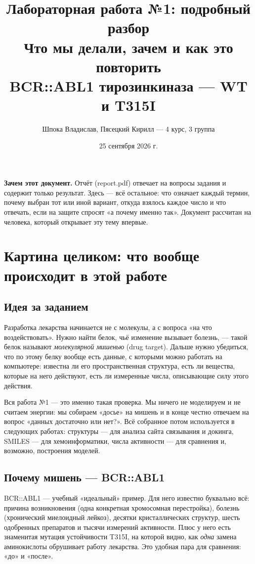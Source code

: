 \documentclass[11pt,a4paper]{article}
\title{\textbf{Лабораторная работа №1: подробный разбор}\\[4pt]
\large Что мы делали, зачем и как это повторить\\[2pt]
\normalsize BCR::ABL1 тирозинкиназа --- WT и T315I}
\author{Шпока Владислав, Пясецкий Кирилл --- 4 курс, 3 группа}
\date{25 сентября 2026 г.}
\newcommand{\code}[1]{{\ttfamily #1}}
\begin{document}
\sloppy
\maketitle

\begin{note}
\textbf{Зачем этот документ.} Отчёт (\code{report.pdf}) отвечает на вопросы задания
и содержит только результат. Здесь --- всё остальное: что означает каждый термин,
почему выбран тот или иной вариант, откуда взялось каждое число и что отвечать,
если на защите спросят «а почему именно так». Документ рассчитан на человека,
который открывает эту тему впервые.
\end{note}

\tableofcontents
\newpage

\section{Картина целиком: что вообще происходит в этой работе}

\subsection{Идея за заданием}

Разработка лекарства начинается не с молекулы, а с вопроса «на что воздействовать».
Нужно найти белок, чьё изменение вызывает болезнь, --- такой белок называют
\emph{молекулярной мишенью} (drug target). Дальше нужно убедиться, что по этому
белку вообще есть данные, с которыми можно работать на компьютере: известна ли
его пространственная структура, есть ли вещества, которые на него действуют, есть
ли измеренные числа, описывающие силу этого действия.

Вся работа №1 --- это именно такая проверка. Мы ничего не моделируем и не считаем
энергии: мы собираем «досье» на мишень и в конце честно отвечаем на вопрос
«данных достаточно или нет?». Всё собранное потом используется в следующих работах:
структуры --- для анализа сайта связывания и докинга, SMILES --- для хемоинформатики,
числа активности --- для сравнения и, возможно, построения моделей.

\subsection{Почему мишень --- BCR::ABL1}

BCR::ABL1 --- учебный «идеальный» пример. Для него известно буквально всё: причина
возникновения (одна конкретная хромосомная перестройка), болезнь (хронический
миелоидный лейкоз), десятки кристаллических структур, шесть одобренных препаратов
и тысячи измерений активности. Плюс у него есть знаменитая мутация устойчивости
T315I, на которой видно, как \emph{одна} замена аминокислоты обрушивает работу
лекарства. Это удобная пара для сравнения: «до» и «после».
\end{document}
